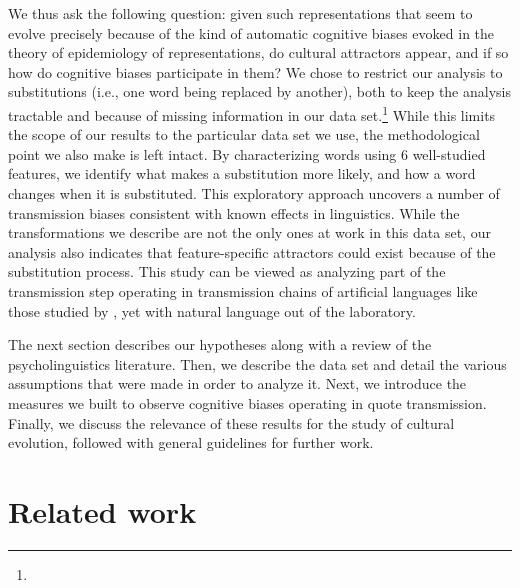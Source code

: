 \begin{new}
We thus ask the following question: given such representations that seem to evolve precisely because of the kind of automatic cognitive biases evoked in the theory of epidemiology of representations, do cultural attractors appear, and if so how do cognitive biases participate in them?
We chose to restrict our analysis to substitutions (i.e., one word being replaced by another), both to keep the analysis tractable and because of missing information in our data set.\footnote{
}
While this limits the scope of our results to the particular data set we use, the methodological point we also make is left intact.  By characterizing words using 6 well-studied features, we identify what makes a substitution more likely, and how a word changes when it is substituted.
This exploratory approach uncovers a number of transmission biases consistent with known effects in linguistics.
While the transformations we describe are not the only ones at work in this data set, our analysis also indicates that feature-specific attractors could exist because of the substitution process.
This study can be viewed as analyzing part of the transmission step operating in transmission chains of artificial languages like those studied by \citet{kirby_cumulative_2008}, yet with natural language out of the laboratory.

The next section %
describes our hypotheses along with a review of the psycholinguistics literature.
Then, we describe the data set and detail the various assumptions that were made in order to analyze it.
Next, we introduce the measures we built to observe cognitive biases operating in quote transmission.
Finally, we discuss the relevance of these results for the study of cultural evolution, followed with general guidelines for further work.%
\end{new}


\section{Related work} %
\label{sec:related}

